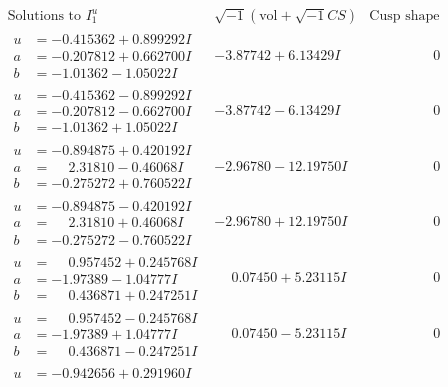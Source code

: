\documentclass[1p]{elsarticle_modified}
\theoremstyle{definition}
\newcommand{\I}{\sqrt{-1}}
\begin{document}
$$\begin{array}{c|c|c}  
\text{Solutions to }I^u_{1}& \I (\text{vol} + \sqrt{-1}CS) & \text{Cusp shape}\\
 \hline 
\begin{aligned}
u &= -0.415362 + 0.899292 I \\
a &= -0.207812 + 0.662700 I \\
b &= -1.01362 - 1.05022 I\end{aligned}
 & -3.87742 + 6.13429 I & \phantom{-0.000000 } 0 \\ \hline\begin{aligned}
u &= -0.415362 - 0.899292 I \\
a &= -0.207812 - 0.662700 I \\
b &= -1.01362 + 1.05022 I\end{aligned}
 & -3.87742 - 6.13429 I & \phantom{-0.000000 } 0 \\ \hline\begin{aligned}
u &= -0.894875 + 0.420192 I \\
a &= \phantom{-}2.31810 - 0.46068 I \\
b &= -0.275272 + 0.760522 I\end{aligned}
 & -2.96780 - 12.19750 I & \phantom{-0.000000 } 0 \\ \hline\begin{aligned}
u &= -0.894875 - 0.420192 I \\
a &= \phantom{-}2.31810 + 0.46068 I \\
b &= -0.275272 - 0.760522 I\end{aligned}
 & -2.96780 + 12.19750 I & \phantom{-0.000000 } 0 \\ \hline\begin{aligned}
u &= \phantom{-}0.957452 + 0.245768 I \\
a &= -1.97389 - 1.04777 I \\
b &= \phantom{-}0.436871 + 0.247251 I\end{aligned}
 & \phantom{-}0.07450 + 5.23115 I & \phantom{-0.000000 } 0 \\ \hline\begin{aligned}
u &= \phantom{-}0.957452 - 0.245768 I \\
a &= -1.97389 + 1.04777 I \\
b &= \phantom{-}0.436871 - 0.247251 I\end{aligned}
 & \phantom{-}0.07450 - 5.23115 I & \phantom{-0.000000 } 0 \\ \hline\begin{aligned}
u &= -0.942656 + 0.291960 I \\

\end{aligned}
\end{array}$$
\end{document}
